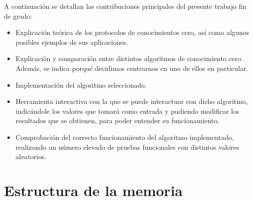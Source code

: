 A continuación se detallan las contribuciones principales del presente trabajo fin de grado:
\begin{itemize}
    \item Explicación teórica de los protocolos de conocimientos cero, así como algunos posibles ejemplos de sus aplicaciones.
    
    \item Explicación y comparación entre distintos algoritmos de conocimiento cero. Además, se indica porqué decidimos centrarnos en uno de ellos en particular.

    \item Implementación del algoritmo seleccionado.

    \item Herramienta interactiva con la que se puede interactuar con dicho algoritmo, indicándole los valores que tomará como entrada y pudiendo modificar los resultados que se obtienen, para poder entender su funcionamiento.

    \item Comprobación del correcto funcionamiento del algoritmo implementado, realizando un número elevado de pruebas funcionales con distintos valores aleatorios.
\end{itemize}

\section{Estructura de la memoria}

